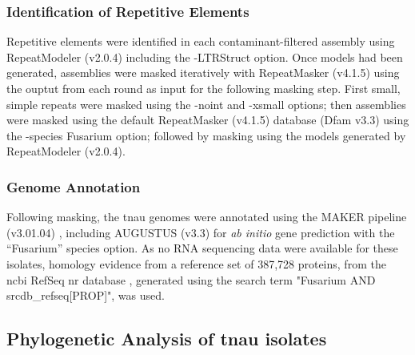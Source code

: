 \subsubsection{Identification of Repetitive Elements}

Repetitive elements were identified in each contaminant-filtered assembly using RepeatModeler (v2.0.4) \parencite{Flynn2020} including the -LTRStruct option. Once models had been generated, assemblies were masked iteratively with RepeatMasker (v4.1.5) \parencite{Smit2010} using the ouptut from each round  as input for the following masking step. First small, simple repeats were masked using the -noint and -xsmall options; then assemblies were masked using the default RepeatMasker (v4.1.5)  database (Dfam v3.3) \parencite{Storer2021} using the -species Fusarium option; followed by masking using the models generated by RepeatModeler (v2.0.4).

\subsubsection{Genome Annotation}
Following masking, the \ac{tnau} genomes were annotated using the MAKER pipeline (v3.01.04) \parencite{Holt2011}, including AUGUSTUS (v3.3) \parencite{Stanke2006} for \textit{ab initio} gene prediction with the “Fusarium” species option. As no RNA sequencing data were available for these isolates, homology evidence from a reference set of 387,728 proteins, from the \ac{ncbi} RefSeq nr database \parencite{Agarwala2016}, generated using the search term "Fusarium AND srcdb\_refseq[PROP]", was used. 

\subsection{Phylogenetic Analysis of \ac{tnau} isolates}\label{chap2:phylogeny}

